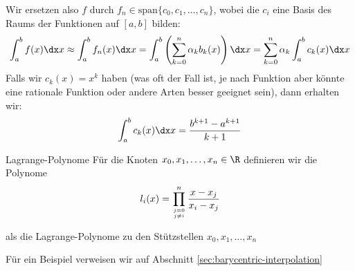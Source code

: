 Wir ersetzen also $f$ durch $f_n \in \text{span} \{ c_0, c_1, \ldots, c_n \}$, wobei die $c_i$ eine Basis des Raums der Funktionen auf $[a, b]$ bilden:
\rmvspace
\begin{align*}
    \int_{a}^{b} f(x) \dx x \approx \int_{a}^{b} f_n(x) \dx x = \int_{a}^{b} \left( \sum_{k = 0}^{n} \alpha_k b_k(x) \right) \dx x = \sum_{k = 0}^{n} \alpha_k \int_{a}^{b} c_k(x) \dx x
\end{align*}
Falls wir $c_k(x) = x^k$ haben (was oft der Fall ist, je nach Funktion aber könnte eine rationale Funktion oder andere Arten besser geeignet sein), dann erhalten wir:
\rmvspace
\begin{align*}
    \int_{a}^{b} c_k(x) \dx x = \frac{b^{k + 1} - a^{k + 1}}{k + 1}
\end{align*}

\begin{definition}[]{Lagrange-Polynome}
    Für die Knoten $x_0, x_1, \ldots, x_n \in \R$ definieren wir die Polynome
    \rmvspace
    \begin{align*}
        l_i(x) = \prod_{j = 0 \atop j \neq i}^n \frac{x - x_j}{x_i - x_j}
    \end{align*}

    \rmvspace
    als die Lagrange-Polynome zu den Stützstellen $x_0, x_1, \ldots, x_n$
\end{definition}
Für ein Beispiel verweisen wir auf Abschnitt \ref{sec:barycentric-interpolation}
